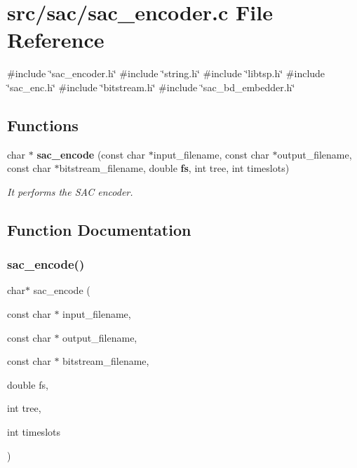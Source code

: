 \section{src/sac/sac\+\_\+encoder.c File Reference}
\label{sac__encoder_8c}
{\ttfamily \#include \char`\"{}sac\+\_\+encoder.\+h\char`\"{}}\newline
{\ttfamily \#include \char`\"{}string.\+h\char`\"{}}\newline
{\ttfamily \#include \char`\"{}libtsp.\+h\char`\"{}}\newline
{\ttfamily \#include \char`\"{}sac\+\_\+enc.\+h\char`\"{}}\newline
{\ttfamily \#include \char`\"{}bitstream.\+h\char`\"{}}\newline
{\ttfamily \#include \char`\"{}sac\+\_\+bd\+\_\+embedder.\+h\char`\"{}}\newline
\subsection*{Functions}
\begin{DoxyCompactItemize}
\item 
char $\ast$ \textbf{ sac\+\_\+encode} (const char $\ast$input\+\_\+filename, const char $\ast$output\+\_\+filename, const char $\ast$bitstream\+\_\+filename, double \textbf{ fs}, int tree, int timeslots)
\begin{DoxyCompactList}\small\item\em It performs the S\+AC encoder. \end{DoxyCompactList}\end{DoxyCompactItemize}


\subsection{Function Documentation}
\mbox{\label{sac__encoder_8c_aa7ad450f2c4d427f5b854a439d959d4d}} 
\subsubsection{sac\+\_\+encode()}
{\footnotesize\ttfamily char$\ast$ sac\+\_\+encode (\begin{DoxyParamCaption}\item[{const char $\ast$}]{input\+\_\+filename,  }\item[{const char $\ast$}]{output\+\_\+filename,  }\item[{const char $\ast$}]{bitstream\+\_\+filename,  }\item[{double}]{fs,  }\item[{int}]{tree,  }\item[{int}]{timeslots }\end{DoxyParamCaption})}




